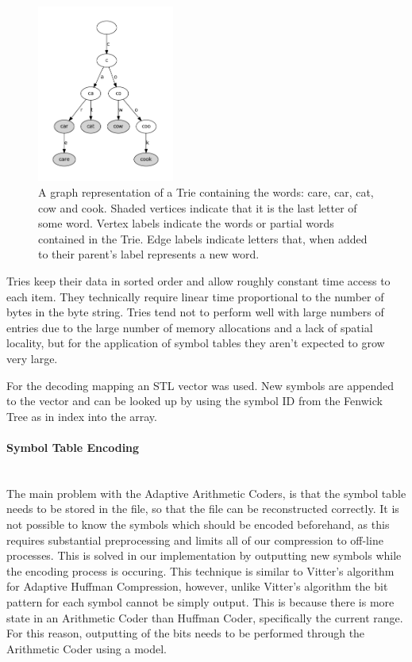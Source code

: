 \documentclass[a4paper,11pt]{report}
\begin{document}
\begin{figure}
 \center
 \includegraphics[width=0.4\textwidth]{resources/trie.pdf}
\caption{A graph representation of a Trie containing the words: care, car, cat, cow and cook. Shaded vertices indicate that it is the last letter of some word. Vertex labels indicate the words or partial words contained in the Trie. Edge labels indicate letters that, when added to their parent's label represents a new word.}
\label{Trie}
\end{figure}

Tries keep their data in sorted order and allow roughly constant time access to each item. They technically require linear time proportional to the number of bytes in the byte string. Tries tend not to perform well with large numbers of entries due to the large number of memory allocations and a lack of spatial locality, but for the application of symbol tables they aren't expected to grow very large. 

For the decoding mapping an STL vector was used. New symbols are appended to the vector and can be looked up by using the symbol ID from the Fenwick Tree as in index into the array.

\paragraph{Symbol Table Encoding} \ \\

The main problem with the Adaptive Arithmetic Coders, is that the symbol table needs to be stored in the file, so that the file can be reconstructed correctly. It is not possible to know the symbols which should be encoded beforehand, as this requires substantial preprocessing and limits all of our compression to off-line processes. This is solved in our implementation by outputting new symbols while the encoding process is occuring. This technique is similar to Vitter's algorithm for Adaptive Huffman Compression, however, unlike Vitter's algorithm the bit pattern for each symbol cannot be simply output. This is because there is more state in an Arithmetic Coder than Huffman Coder, specifically the current range. For this reason, outputting of the bits needs to be performed through the Arithmetic Coder using a model. 
\end{document}

